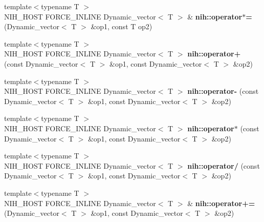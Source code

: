 \begin{DoxyCompactItemize}
\item 
\hypertarget{group__vectors_gaafcb7f500fcb5c8227c8c0b5f0161493}{
{\footnotesize template$<$typename T $>$ }\\\-N\-I\-H\-\_\-\-H\-O\-S\-T \-F\-O\-R\-C\-E\-\_\-\-I\-N\-L\-I\-N\-E \*
\-Dynamic\-\_\-vector$<$ \-T $>$ \& {\bfseries nih\-::operator$\ast$=} (\-Dynamic\-\_\-vector$<$ \-T $>$ \&op1, const \-T op2)}
\label{group__vectors_gaafcb7f500fcb5c8227c8c0b5f0161493}

\item 
\hypertarget{group__vectors_ga76724637f0956192e7a27a921043fa37}{
{\footnotesize template$<$typename T $>$ }\\\-N\-I\-H\-\_\-\-H\-O\-S\-T \-F\-O\-R\-C\-E\-\_\-\-I\-N\-L\-I\-N\-E \*
\-Dynamic\-\_\-vector$<$ \-T $>$ {\bfseries nih\-::operator+} (const \-Dynamic\-\_\-vector$<$ \-T $>$ \&op1, const \-Dynamic\-\_\-vector$<$ \-T $>$ \&op2)}
\label{group__vectors_ga76724637f0956192e7a27a921043fa37}

\item 
\hypertarget{group__vectors_ga6d28166a3044ce64d8a2ab00822cb0d4}{
{\footnotesize template$<$typename T $>$ }\\\-N\-I\-H\-\_\-\-H\-O\-S\-T \-F\-O\-R\-C\-E\-\_\-\-I\-N\-L\-I\-N\-E \*
\-Dynamic\-\_\-vector$<$ \-T $>$ {\bfseries nih\-::operator-\/} (const \-Dynamic\-\_\-vector$<$ \-T $>$ \&op1, const \-Dynamic\-\_\-vector$<$ \-T $>$ \&op2)}
\label{group__vectors_ga6d28166a3044ce64d8a2ab00822cb0d4}

\item 
\hypertarget{group__vectors_gaad54f453a918650977e577d1f1295942}{
{\footnotesize template$<$typename T $>$ }\\\-N\-I\-H\-\_\-\-H\-O\-S\-T \-F\-O\-R\-C\-E\-\_\-\-I\-N\-L\-I\-N\-E \*
\-Dynamic\-\_\-vector$<$ \-T $>$ {\bfseries nih\-::operator$\ast$} (const \-Dynamic\-\_\-vector$<$ \-T $>$ \&op1, const \-Dynamic\-\_\-vector$<$ \-T $>$ \&op2)}
\label{group__vectors_gaad54f453a918650977e577d1f1295942}

\item 
\hypertarget{group__vectors_gab31a91c8d2c51f20dd314272f8416391}{
{\footnotesize template$<$typename T $>$ }\\\-N\-I\-H\-\_\-\-H\-O\-S\-T \-F\-O\-R\-C\-E\-\_\-\-I\-N\-L\-I\-N\-E \*
\-Dynamic\-\_\-vector$<$ \-T $>$ {\bfseries nih\-::operator/} (const \-Dynamic\-\_\-vector$<$ \-T $>$ \&op1, const \-Dynamic\-\_\-vector$<$ \-T $>$ \&op2)}
\label{group__vectors_gab31a91c8d2c51f20dd314272f8416391}

\item 
\hypertarget{group__vectors_gabb3d30c7da278fc844597f94d0a15fec}{
{\footnotesize template$<$typename T $>$ }\\\-N\-I\-H\-\_\-\-H\-O\-S\-T \-F\-O\-R\-C\-E\-\_\-\-I\-N\-L\-I\-N\-E \*
\-Dynamic\-\_\-vector$<$ \-T $>$ \& {\bfseries nih\-::operator+=} (\-Dynamic\-\_\-vector$<$ \-T $>$ \&op1, const \-Dynamic\-\_\-vector$<$ \-T $>$ \&op2)}
\label{group__vectors_gabb3d30c7da278fc844597f94d0a15fec}


\end{DoxyCompactItemize}
